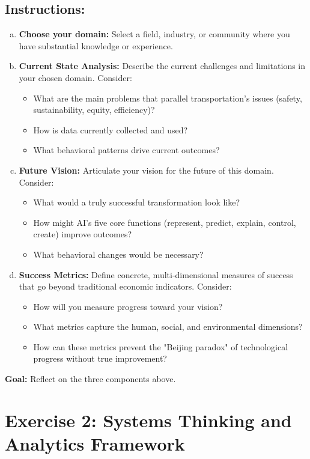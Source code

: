\documentclass[11pt]{article}
\begin{document}
\subsection*{Instructions:}
\begin{enumerate}[(a)]
\item \textbf{Choose your domain:} Select a field, industry, or community where you have substantial knowledge or experience.

\item \textbf{Current State Analysis:} Describe the current challenges and limitations in your chosen domain. Consider:
\begin{itemize}
\item What are the main problems that parallel transportation's issues (safety, sustainability, equity, efficiency)?
\item How is data currently collected and used?
\item What behavioral patterns drive current outcomes?
\end{itemize}

\item \textbf{Future Vision:} Articulate your vision for the future of this domain. Consider:
\begin{itemize}
\item What would a truly successful transformation look like?
\item How might AI's five core functions (represent, predict, explain, control, create) improve outcomes?
\item What behavioral changes would be necessary?
\end{itemize}

\item \textbf{Success Metrics:} Define concrete, multi-dimensional measures of success that go beyond traditional economic indicators. Consider:
\begin{itemize}
\item How will you measure progress toward your vision?
\item What metrics capture the human, social, and environmental dimensions?
\item How can these metrics prevent the "Beijing paradox" of technological progress without true improvement?
\end{itemize}
\end{enumerate}

\noindent\textbf{Goal:} Reflect on the three components above.

\section*{Exercise 2: Systems Thinking and Analytics Framework}
\end{document}
